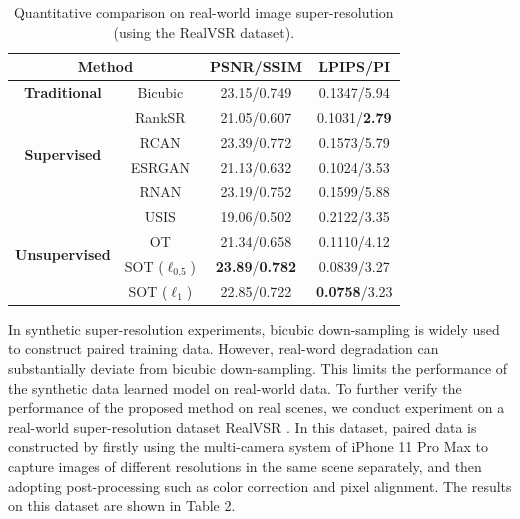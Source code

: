 \documentclass[10pt,journal,compsoc]{IEEEtran}
\begin{document}
\begin{table}[!t]
	\renewcommand\arraystretch{2}
	\footnotesize
	\centering
	\caption{Quantitative comparison on real-world image super-resolution (using the RealVSR dataset).}
        \begin{tabular}{|cc|c|c|}
		\hline
		\multicolumn{2}{|c|}{\textbf{Method}}                               & \textbf{PSNR/SSIM} & \textbf{LPIPS/PI}           \\ \hline
		\multicolumn{1}{|c|}{\textbf{Traditional}}                   & Bicubic & 23.15/0.749 & 0.1347/5.94
		 \\ \hline
		\multicolumn{1}{|c|}{\multirow{4}{*}{\textbf{Supervised}}}  & RankSR\cite{ranksrgan}  & 21.05/0.607 & 0.1031/\textbf{2.79} \\ \cline{2-4} 
		\multicolumn{1}{|c|}{}                       & RCAN\cite{rcan}    & 23.39/0.772 & 0.1573/5.79 \\ \cline{2-4} 
		\multicolumn{1}{|c|}{}                       & ESRGAN\cite{wang2018esrgan}  & 21.13/0.632 & 0.1024/3.53 \\ \cline{2-4} 
		\multicolumn{1}{|c|}{}                       & RNAN\cite{rnan}    & 23.19/0.752 & 0.1599/5.88 \\ \hline
		\multicolumn{1}{|c|}{\multirow{4}{*}{\textbf{Unsupervised}}} & USIS\cite{usis}    & 19.06/0.502 & 0.2122/3.35 \\ \cline{2-4} 
		\multicolumn{1}{|c|}{}                       & OT\cite{wang2022optimal}     & 21.34/0.658 & 0.1110/4.12 \\ \cline{2-4} 
		\multicolumn{1}{|c|}{}                       & SOT ($\ell_{0.5}$)   & \textbf{23.89}/\textbf{0.782} & 0.0839/3.27 \\ \cline{2-4} 
		\multicolumn{1}{|c|}{}                       & SOT ($\ell_1$)  & 22.85/0.722 & \textbf{0.0758}/3.23 \\ \hline
	\end{tabular}
\end{table}

In synthetic super-resolution experiments, bicubic down-sampling 
is widely used to construct paired training data. However, 
real-word degradation can substantially deviate from bicubic down-sampling.
This limits the performance of the synthetic data learned model on real-world data.
To further verify the performance of the proposed method on real scenes, 
we conduct experiment on a real-world super-resolution dataset RealVSR \cite{realVSR}. 
In this dataset, paired data is constructed by firstly using the 
multi-camera system of iPhone 11 Pro Max to capture images 
of different resolutions in the same scene separately, 
and then adopting post-processing such as color correction and pixel alignment. 
The results on this dataset are shown in Table 2.
\end{document}
